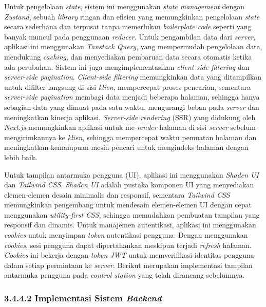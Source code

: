Untuk pengelolaan \emph{state}, sistem ini menggunakan \emph{state management} dengan \emph{Zustand}, sebuah \emph{library} ringan dan efisien yang memungkinkan pengelolaan \emph{state} secara sederhana dan terpusat tanpa memerlukan \emph{boilerplate code} seperti yang banyak muncul pada penggunaan \emph{reducer}. Untuk pengambilan data dari \emph{server}, aplikasi ini menggunakan \emph{Tanstack Query}, yang mempermudah pengelolaan data, mendukung \emph{caching}, dan menyediakan pembaruan data secara otomatis ketika ada perubahan. Sistem ini juga mengimplementasikan \emph{client-side filtering} dan \emph{server-side pagination}. \emph{Client-side filtering} memungkinkan data yang ditampilkan untuk difilter langsung di sisi \emph{klien}, mempercepat proses pencarian, sementara \emph{server-side pagination} membagi data menjadi beberapa halaman, sehingga hanya sebagian data yang dimuat pada satu waktu, mengurangi beban pada \emph{server} dan meningkatkan kinerja aplikasi. \emph{Server-side rendering} (SSR) yang didukung oleh \emph{Next.js} memungkinkan aplikasi untuk me-\emph{render} halaman di sisi \emph{server} sebelum mengirimkannya ke \emph{klien}, sehingga mempercepat waktu pemuatan halaman dan meningkatkan kemampuan mesin pencari untuk mengindeks halaman dengan lebih baik.

Untuk tampilan antarmuka pengguna (UI), aplikasi ini menggunakan \emph{Shadcn UI} dan \emph{Tailwind CSS}. \emph{Shadcn UI} adalah pustaka komponen UI yang menyediakan elemen-elemen desain minimalis dan responsif, sementara \emph{Tailwind CSS} memungkinkan pengembang untuk mendesain elemen-elemen UI dengan cepat menggunakan \emph{utility-first CSS}, sehingga memudahkan pembuatan tampilan yang responsif dan dinamis. Untuk manajemen autentikasi, aplikasi ini menggunakan \emph{cookies} untuk menyimpan \emph{token} autentikasi pengguna. Dengan menggunakan \emph{cookies}, sesi pengguna dapat dipertahankan meskipun terjadi \emph{refresh} halaman. \emph{Cookies} ini bekerja dengan \emph{token JWT} untuk memverifikasi identitas pengguna dalam setiap permintaan ke \emph{server}. Berikut merupakan implementasi tampilan antarmuka pengguna pada \emph{control station} yang telah dirancang sebelumnya.

\subsubsection{3.4.4.2 Implementasi Sistem \emph{Backend}}

